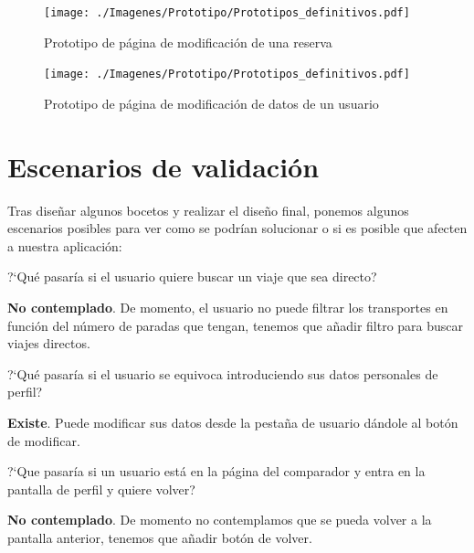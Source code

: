 \begin{figure}[H]
    \centering
    \texttt{[image: ./Imagenes/Prototipo/Prototipos\_definitivos.pdf]}
    \label{fig:prot_reservas_mod}
    \caption{Prototipo de página de modificación de una reserva}
\end{figure}

\begin{figure}[H]
    \centering
    \texttt{[image: ./Imagenes/Prototipo/Prototipos\_definitivos.pdf]}
    \label{fig:prot_usuario_mod}
    \caption{Prototipo de página de modificación de datos de un usuario}
\end{figure}




\section{Escenarios de validación}
Tras diseñar algunos bocetos y realizar el diseño final, ponemos algunos escenarios posibles para ver como se podrían solucionar o si es posible que afecten a nuestra aplicación:

\begin{escenario} %
    \centering
?`Qué pasaría si el usuario quiere buscar un viaje que sea directo? 
\begin{solucion} \centering
    \textbf{No contemplado}. De momento, el usuario no puede filtrar los transportes en función del número de paradas que tengan, tenemos que añadir filtro para buscar viajes directos.
\end{solucion}
\end{escenario}

\begin{escenario} %
    \centering
?`Qué pasaría si el usuario se equivoca introduciendo sus datos personales de perfil? 

\begin{solucion} \centering
    \textbf{Existe}. Puede modificar sus datos desde la pestaña de usuario dándole al botón de modificar.
\end{solucion}
\end{escenario}

\begin{escenario} %
    \centering
?`Que pasaría si un usuario está en la página del comparador y entra en la pantalla de perfil y quiere volver?

\begin{solucion} \centering
    \textbf{No contemplado}. De momento no contemplamos que se pueda volver a la pantalla anterior, tenemos que añadir botón de volver. 
\end{solucion}
\end{escenario}

